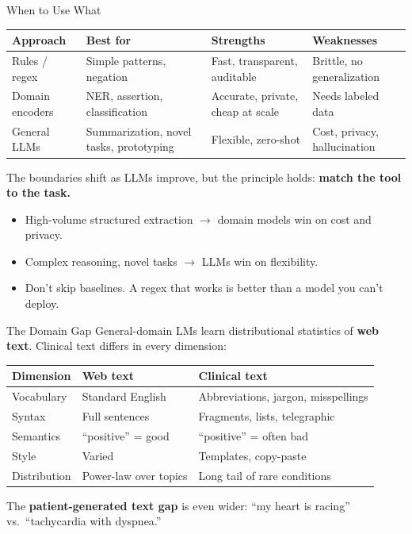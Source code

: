 \documentclass[aspectratio=169,11pt]{beamer}
\begin{document}
\begin{frame}{When to Use What}
\small
\begin{center}
\scriptsize
\begin{tabular}{lp{2.8cm}p{3cm}p{3cm}}
\toprule
\textbf{Approach} & \textbf{Best for} & \textbf{Strengths} & \textbf{Weaknesses} \\
\midrule
Rules / regex & Simple patterns, negation & Fast, transparent, auditable & Brittle, no generalization \\
Domain encoders & NER, assertion, classification & Accurate, private, cheap at scale & Needs labeled data \\
General LLMs & Summarization, novel tasks, prototyping & Flexible, zero-shot & Cost, privacy, hallucination \\
\bottomrule
\end{tabular}
\end{center}

\vspace{0.2em}
The boundaries shift as LLMs improve, but the principle holds: \textbf{match the tool to the task.}
\begin{itemize}\setlength\itemsep{0em}
  \item High-volume structured extraction $\rightarrow$ domain models win on cost and privacy.
  \item Complex reasoning, novel tasks $\rightarrow$ LLMs win on flexibility.
  \item Don't skip baselines. A regex that works is better than a model you can't deploy.
\end{itemize}
\end{frame}

\begin{frame}{The Domain Gap}
General-domain LMs learn distributional statistics of \textbf{web text}. Clinical text differs in every dimension:

\vspace{0.2em}
\small
\begin{center}
\begin{tabular}{lll}
\toprule
\textbf{Dimension} & \textbf{Web text} & \textbf{Clinical text} \\
\midrule
Vocabulary & Standard English & Abbreviations, jargon, misspellings \\
Syntax & Full sentences & Fragments, lists, telegraphic \\
Semantics & ``positive'' = good & ``positive'' = often bad \\
Style & Varied & Templates, copy-paste \\
Distribution & Power-law over topics & Long tail of rare conditions \\
\bottomrule
\end{tabular}
\end{center}

\vspace{0.2em}
The \textbf{patient-generated text gap} is even wider: ``my heart is racing'' vs.\ ``tachycardia with dyspnea.''
\end{frame}
\end{document}
